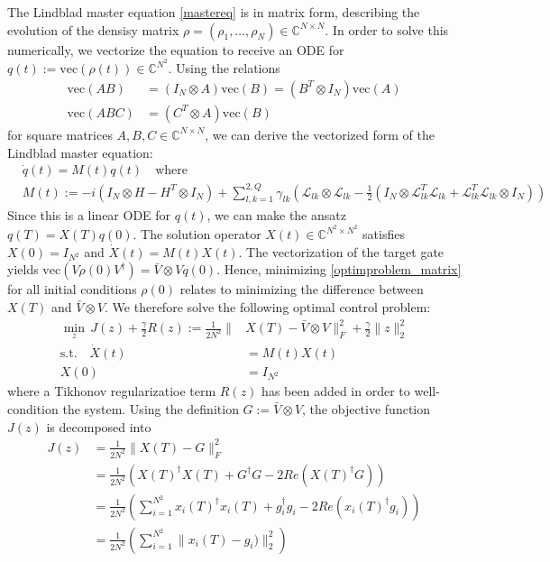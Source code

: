 \documentclass[letterpaper]{article}
\newcommand{\Ell}{\mathcal{L}}
\newcommand{\C}{\mathds{C}}
\begin{document}
The Lindblad master equation \eqref{mastereq} is in matrix form, describing the evolution of the densisy matrix $\rho = (\rho_1, \dots, \rho_N) \in \C^{N\times N}$. In order to solve this numerically, we vectorize the equation to receive an ODE for $q(t) := \text{vec}(\rho(t)) \in \C^{N^2}$. Using the relations
\begin{align}
  \text{vec}(AB) &= (I_N\otimes A)\text{vec}(B) = (B^T\otimes I_N)\text{vec}(A) \\
  \text{vec}(ABC) &= (C^T\otimes A)\text{vec}(B)
\end{align}
for square matrices $A,B,C\in\C^{N\times N}$, we can derive the vectorized form of the Lindblad master equation:
\begin{align}\label{mastereq_vectorized}
  &\dot q(t) = M(t) q(t) \quad  \text{where} \\
  &M(t) := -i(I_N\otimes H - H^T \otimes I_N) + \sum_{l,k=1}^{2,Q} \gamma_{lk} \left( \Ell_{lk}\otimes \Ell_{lk} - \frac 1 2 \left( I_N\otimes \Ell^T_{lk}\Ell_{lk} + \Ell^T_{lk}\Ell_{lk} \otimes I_N \right) \right)
\end{align}
Since this is a linear ODE for $q(t)$, we can make the ansatz $q(T) = X(T) q(0)$. The solution operator $X(t) \in \C^{N^2\times N^2}$ satisfies $X(0) = I_{N^2}$ and $\dot X(t) = M(t) X(t)$. The vectorization of the target gate yields $\text{vec}(V\rho(0)V^{\dagger}) = \bar V\otimes V q(0)$. Hence, minimizing \eqref{optimproblem_matrix} for all initial conditions $\rho(0)$ relates to minimizing the difference between $X(T)$ and $\bar V\otimes V$. We therefore solve the following optimal control problem:
\begin{align}\label{optimproblem_final}
  \min_z \, J(z) + \frac{\gamma}{2}R(z) := \frac {1}{2N^2} \| &X(T) - \bar V \otimes V \|^2_F + \frac{\gamma}{2} \|z\|^2_2 \\
  \text{s.t.} \quad \dot X(t) &= M(t) X(t)  \\
                    X(0) &= I_{N^2}
\end{align}
where a Tikhonov regularizatioe term $R(z)$ has been added in order to well-condition the system. Using the definition $G := \bar V\otimes V$, the objective function $J(z)$ is decomposed into
\begin{align}
  J(z) &= \frac{1}{2N^2} \| X(T) - G\|^2_F \label{eq:objective}\\
       &= \frac{1}{2N^2} \left( X(T)^{\dagger}X(T) + G^{\dagger}G - 2Re(X(T)^{\dagger}G) \right) \\
       &= \frac{1}{2N^2} \left( \sum_{i=1}^{N^2} x_i(T)^{\dagger}x_i(T) + g_i^{\dagger}g_i - 2Re(x_i(T)^{\dagger}g_i) \right) \\
       &= \frac{1}{2N^2} \left( \sum_{i=1}^{N^2} \| x_i(T) - g_i) \|^2_2 \right) \\
\end{align}
\end{document}
